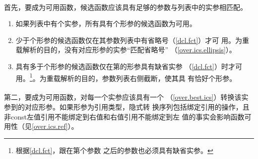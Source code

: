 \paragraph{}
首先，要成为可用函数，候选函数应该具有足够的参数与列表中的实参相匹配。
\begin{enumerate}
  \item{如果列表中有个实参，所有具有个形参的候选函数为可用。}
  \item{少于个形参的候选函数仅在其参数列表中有省略号（\ref{dcl.fct}）才可
    用。为重载解析的目的，没有对应形参的实参``匹配省略号''
    （\ref{over.ics.ellipsis}）。}
  \item{具有多于个形参的候选函数仅在第的形参具有缺省实参
    （\ref{dcl.fct}）时才可用。\footnote{根据\ref{dcl.fct}，跟在第个参数
    之后的参数也必须具有缺省实参。}。为重载解析的目的，参数列表右侧截断，使其具
    有恰好个形参。}
\end{enumerate}

\paragraph{}
第二，要成为可用函数，对每一个实参应该具有一个
（\ref{over.best.ics}）转换该实参到的对应形参。如果形参为引用类型，隐式转
换序列包括绑定引用的操作，且非const左值引用不能绑定到右值和右值引用不能绑定到左
值的事实会影响函数可用性（见\ref{over.ics.ref}）。

